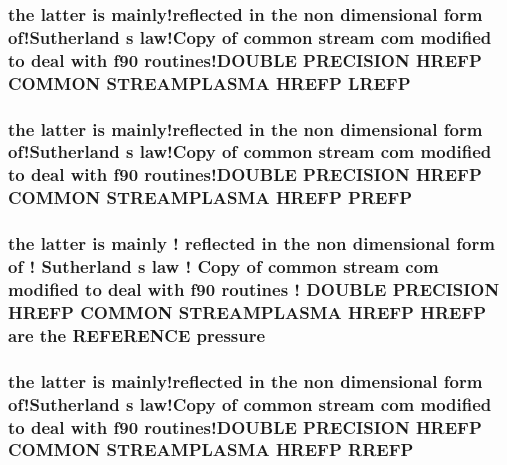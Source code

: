 \hypertarget{streamplasma_8com_a2615938ffd6bf7e79a790aca064ad765}{
\subsubsection[{L\-R\-E\-F\-P}]{\setlength{\rightskip}{0pt plus 5cm}the latter is mainly!reflected in the non dimensional form of!\-Sutherland s law!\-Copy of common stream com modified to deal with f90 routines!\-D\-O\-U\-B\-L\-E P\-R\-E\-C\-I\-S\-I\-O\-N H\-R\-E\-F\-P C\-O\-M\-M\-O\-N S\-T\-R\-E\-A\-M\-P\-L\-A\-S\-M\-A H\-R\-E\-F\-P L\-R\-E\-F\-P}}\label{streamplasma_8com_a2615938ffd6bf7e79a790aca064ad765}
\hypertarget{streamplasma_8com_aae05c29a1ba25a18ea74249350612095}{
\subsubsection[{P\-R\-E\-F\-P}]{\setlength{\rightskip}{0pt plus 5cm}the latter is mainly!reflected in the non dimensional form of!\-Sutherland s law!\-Copy of common stream com modified to deal with f90 routines!\-D\-O\-U\-B\-L\-E P\-R\-E\-C\-I\-S\-I\-O\-N H\-R\-E\-F\-P C\-O\-M\-M\-O\-N S\-T\-R\-E\-A\-M\-P\-L\-A\-S\-M\-A H\-R\-E\-F\-P P\-R\-E\-F\-P}}\label{streamplasma_8com_aae05c29a1ba25a18ea74249350612095}
\hypertarget{streamplasma_8com_a061f6a0622bc09f6559b154216c21ace}{
\subsubsection[{pressure}]{\setlength{\rightskip}{0pt plus 5cm}the latter is mainly ! reflected in the non dimensional form of ! Sutherland s law ! Copy of common stream com modified to deal with f90 routines ! D\-O\-U\-B\-L\-E P\-R\-E\-C\-I\-S\-I\-O\-N H\-R\-E\-F\-P C\-O\-M\-M\-O\-N S\-T\-R\-E\-A\-M\-P\-L\-A\-S\-M\-A H\-R\-E\-F\-P H\-R\-E\-F\-P {\bf are} the R\-E\-F\-E\-R\-E\-N\-C\-E pressure}}\label{streamplasma_8com_a061f6a0622bc09f6559b154216c21ace}
\hypertarget{streamplasma_8com_adb75412f07c57a9251dabfcc07e20c30}{
\subsubsection[{R\-R\-E\-F\-P}]{\setlength{\rightskip}{0pt plus 5cm}the latter is mainly!reflected in the non dimensional form of!\-Sutherland s law!\-Copy of common stream com modified to deal with f90 routines!\-D\-O\-U\-B\-L\-E P\-R\-E\-C\-I\-S\-I\-O\-N H\-R\-E\-F\-P C\-O\-M\-M\-O\-N S\-T\-R\-E\-A\-M\-P\-L\-A\-S\-M\-A H\-R\-E\-F\-P R\-R\-E\-F\-P}}\label{streamplasma_8com_adb75412f07c57a9251dabfcc07e20c30}
